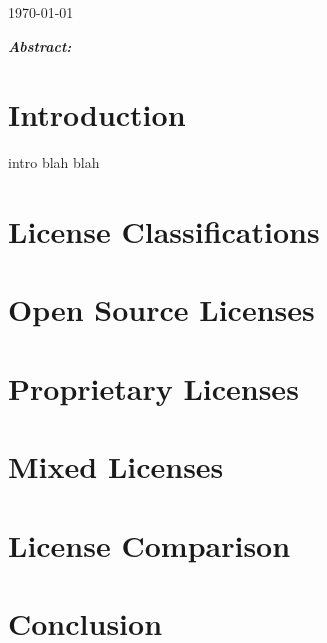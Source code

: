 \documentclass[10pt, onecolumn]{witseiepaper}
\begin{document}
\begin{titlepage}
\begin{center}
				
		{\large \today}\\[1.25cm]
				
					
		 \begin{minipage}
		 	{1	\textwidth} 
		 	\begin{flushleft}
		 	
		 	\large \emph{\textbf{Abstract:}}\\
		  			 			 	
		  	\end{flushleft}
		 \end{minipage}
	\end{center}

\end{titlepage}	
	

\tableofcontents


\section{Introduction}

intro blah blah \cite{Java}



\section{License Classifications}

\section{Open Source Licenses}


\section{Proprietary Licenses}

\section{Mixed Licenses}

\section{License Comparison}

\section{Conclusion}


\newpage



\end{document}
